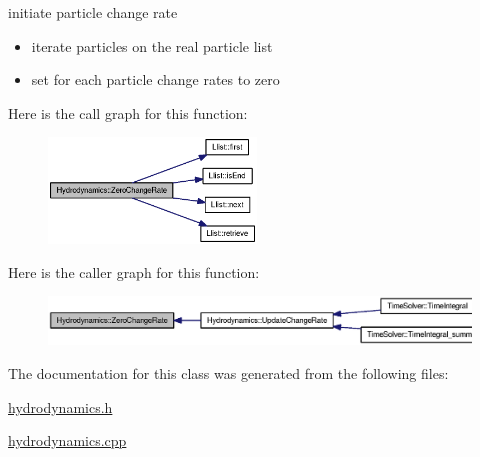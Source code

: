 initiate particle change rate 



\begin{itemize}
\item iterate particles on the real particle list\end{itemize}


\begin{itemize}
\item set for each particle change rates to zero \end{itemize}


Here is the call graph for this function:\nopagebreak
\begin{figure}[H]
\begin{center}
\leavevmode
\includegraphics[width=157pt]{classHydrodynamics_67e2d72d69156a086d43168f5cd58bf7_cgraph}
\end{center}
\end{figure}


Here is the caller graph for this function:\nopagebreak
\begin{figure}[H]
\begin{center}
\leavevmode
\includegraphics[width=351pt]{classHydrodynamics_67e2d72d69156a086d43168f5cd58bf7_icgraph}
\end{center}
\end{figure}


The documentation for this class was generated from the following files:\begin{CompactItemize}
\item 
\hyperlink{hydrodynamics_8h}{hydrodynamics.h}\item 
\hyperlink{hydrodynamics_8cpp}{hydrodynamics.cpp}\end{CompactItemize}
